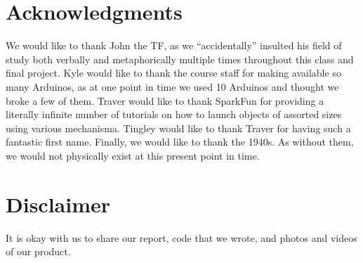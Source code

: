 \documentclass{es50report}
\begin{document}
    \section{Acknowledgments}
        We would like to thank John the TF, as we ``accidentally'' insulted his field of study both verbally and metaphorically multiple times throughout this class and final project. Kyle would like to thank the course staff for making available so many Arduinos, as at one point in time we used 10 Arduinos and thought we broke a few of them. Traver would like to thank SparkFun for providing a literally infinite number of tutorials on how to launch objects of assorted sizes using various mechanisma. Tingley would like to thank Traver for having such a fantastic first name. Finally, we would like to thank the 1940s. As without them, we would not physically exist at this present point in time.

    \section{Disclaimer}
        It is okay with us to share our report, code that we wrote, and photos and videos of our product.

    \newpage
    
    
\end{document}
